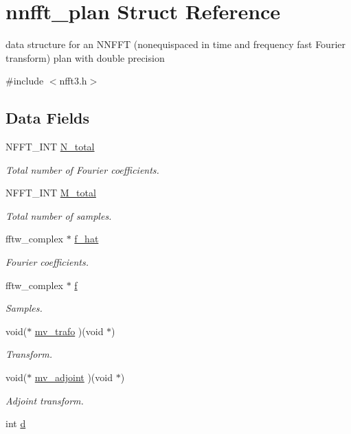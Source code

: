 \hypertarget{structnnfft__plan}{\section{nnfft\-\_\-plan Struct Reference}
\label{structnnfft__plan}
}


data structure for an N\-N\-F\-F\-T (nonequispaced in time and frequency fast Fourier transform) plan with double precision  




{\ttfamily \#include $<$nfft3.\-h$>$}

\subsection*{Data Fields}
\begin{DoxyCompactItemize}
\item 
N\-F\-F\-T\-\_\-\-I\-N\-T \hyperlink{structnnfft__plan_a708632d14ec9f925d636ab5ca262f660}{N\-\_\-total}
\begin{DoxyCompactList}\small\item\em Total number of Fourier coefficients. \end{DoxyCompactList}\item 
N\-F\-F\-T\-\_\-\-I\-N\-T \hyperlink{structnnfft__plan_a3ae8600600f003c1c9932847d695588d}{M\-\_\-total}
\begin{DoxyCompactList}\small\item\em Total number of samples. \end{DoxyCompactList}\item 
fftw\-\_\-complex $\ast$ \hyperlink{structnnfft__plan_ab13f0f93fe991a5831ff78312f9b9e4b}{f\-\_\-hat}
\begin{DoxyCompactList}\small\item\em Fourier coefficients. \end{DoxyCompactList}\item 
fftw\-\_\-complex $\ast$ \hyperlink{structnnfft__plan_a773de7440f04f7d3e23419cd94caa2eb}{f}
\begin{DoxyCompactList}\small\item\em Samples. \end{DoxyCompactList}\item 
void($\ast$ \hyperlink{structnnfft__plan_ac2beab555e72c8f10921db21dc094069}{mv\-\_\-trafo} )(void $\ast$)
\begin{DoxyCompactList}\small\item\em Transform. \end{DoxyCompactList}\item 
void($\ast$ \hyperlink{structnnfft__plan_a0afd6961b8b0b24b526e034d89874c7c}{mv\-\_\-adjoint} )(void $\ast$)
\begin{DoxyCompactList}\small\item\em Adjoint transform. \end{DoxyCompactList}\item 
\hypertarget{structnnfft__plan_a97241bcd9654d3e90a556806e7998ab6}{int \hyperlink{structnnfft__plan_a97241bcd9654d3e90a556806e7998ab6}{d}}\label{structnnfft__plan_a97241bcd9654d3e90a556806e7998ab6}


\end{DoxyCompactItemize}
